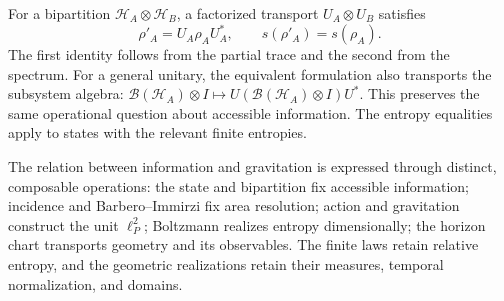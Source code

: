 For a bipartition \(\mathcal H_A\otimes\mathcal H_B\), a
factorized transport \(U_A\otimes U_B\) satisfies
\[
 \rho'_A=U_A\rho_AU_A^*,\qquad s(\rho'_A)=s(\rho_A).
\]
The first identity follows from the partial trace and the second from the spectrum.
For a general unitary, the equivalent formulation also transports
the subsystem algebra:
\(\mathcal B(\mathcal H_A)\otimes I\mapsto
U(\mathcal B(\mathcal H_A)\otimes I)U^*\).
This preserves the same operational question about accessible
information. The entropy equalities apply to states with the relevant finite
entropies.

The relation between information and gravitation is expressed through
distinct, composable operations: the state and bipartition fix accessible
information; incidence and Barbero--Immirzi fix area
resolution; action and gravitation construct the unit \(\ell_P^2\);
Boltzmann realizes entropy dimensionally; the horizon chart
transports geometry and its observables. The finite laws retain
relative entropy, and the geometric realizations retain their measures,
temporal normalization, and domains.
